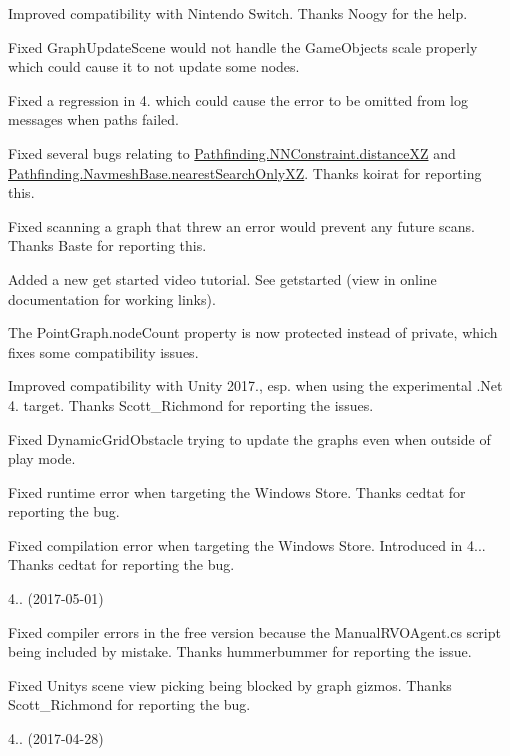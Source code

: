 \begin{DoxyItemize}
\begin{DoxyItemize}
\item Improved compatibility with Nintendo Switch. Thanks Noogy for the help.
\item Fixed Graph\+Update\+Scene would not handle the Game\+Object\textquotesingle{}s scale properly which could cause it to not update some nodes.
\item Fixed a regression in 4. which could cause the error to be omitted from log messages when paths failed.
\item Fixed several bugs relating to \mbox{\hyperlink{class_pathfinding_1_1_n_n_constraint_a5bf8143fe7fa47bf1520164350503bbf}{Pathfinding.\+N\+N\+Constraint.\+distance\+XZ}} and \mbox{\hyperlink{class_pathfinding_1_1_navmesh_base_a8247471c6dba57c8427abf5069451a5a}{Pathfinding.\+Navmesh\+Base.\+nearest\+Search\+Only\+XZ}}. Thanks koirat for reporting this.
\item Fixed scanning a graph that threw an error would prevent any future scans. Thanks Baste for reporting this.
\item Added a new get started video tutorial. See getstarted (view in online documentation for working links).
\item The Point\+Graph.\+node\+Count property is now protected instead of private, which fixes some compatibility issues.
\item Improved compatibility with Unity 2017., esp. when using the experimental .Net 4. target. Thanks Scott\+\_\+\+Richmond for reporting the issues.
\item Fixed Dynamic\+Grid\+Obstacle trying to update the graphs even when outside of play mode.
\item Fixed runtime error when targeting the Windows Store. Thanks cedtat for reporting the bug.
\item Fixed compilation error when targeting the Windows Store. Introduced in 4... Thanks cedtat for reporting the bug.
\end{DoxyItemize}
\item 4.. (2017-\/05-\/01)
\begin{DoxyItemize}
\item Fixed compiler errors in the free version because the Manual\+R\+V\+O\+Agent.\+cs script being included by mistake. Thanks hummerbummer for reporting the issue.
\item Fixed Unity\textquotesingle{}s scene view picking being blocked by graph gizmos. Thanks Scott\+\_\+\+Richmond for reporting the bug.
\end{DoxyItemize}
\item 4.. (2017-\/04-\/28)

\end{DoxyItemize}
